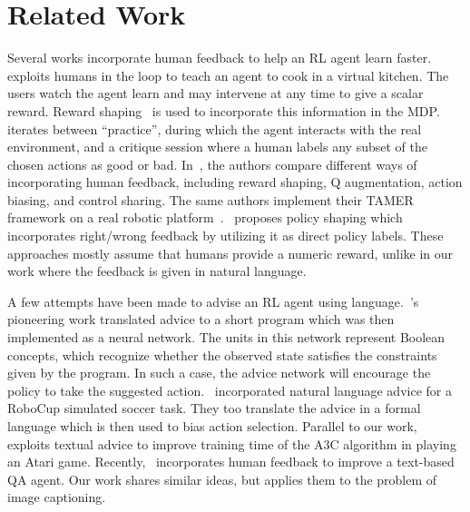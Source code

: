 \vspace{-3.5mm}
\section{Related Work}
\label{sec:related}
\vspace{-1.5mm}

Several works incorporate human feedback to help an RL agent learn faster.  %
~\cite{Thomaz06} exploits humans in the loop to teach an agent to cook in a virtual kitchen. The users watch the agent learn and may intervene at any time to give a scalar reward. Reward shaping~\cite{Ng99} is used to incorporate this information in the MDP.
~\cite{Judah10} iterates between ``practice'', during which the agent interacts with the real environment, and a critique session where a human labels any subset of the chosen actions as good or bad. In~\cite{Knox12}, the authors compare different ways of incorporating human feedback, including reward shaping, Q augmentation, action biasing, and control sharing. The same authors implement their TAMER framework on a real robotic platform~\cite{Knox13}.~\cite{shaping} proposes policy shaping which incorporates right/wrong feedback by utilizing it as direct policy labels.
These approaches mostly assume that humans provide a numeric reward, unlike in our work where the feedback is given in natural language.

A few attempts have been made to advise an RL agent using language.~\cite{Maclin94}'s pioneering work translated advice to a short program which was then implemented as a neural network. The units in this network represent Boolean concepts, which recognize whether the observed state satisfies the constraints given by the program. In such a case, the advice network will encourage the policy to take the suggested action.~\cite{Kuhlmann04} incorporated natural language advice for a RoboCup simulated soccer task. They too translate the advice in a formal language which is then used to bias action selection. Parallel to our work,~\cite{Kaplan17} exploits textual advice to improve training time of the A3C algorithm in playing an Atari game. %
Recently,~\cite{Weston16,Weston16b} incorporates human feedback to improve a text-based QA agent. Our work shares similar ideas, but applies them to the problem of image captioning.

